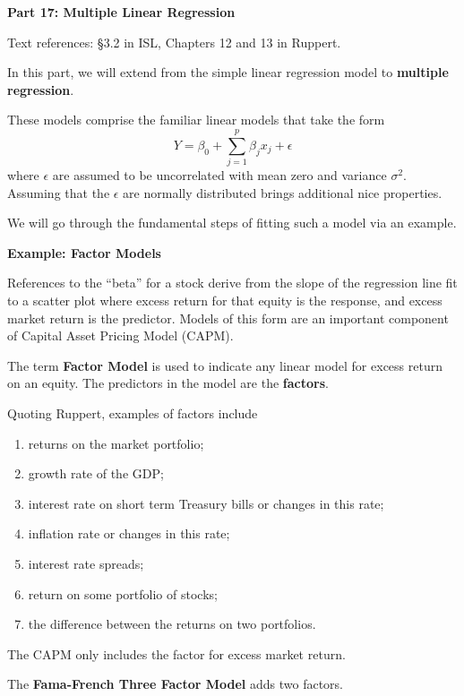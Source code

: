 \documentclass{report}
\begin{document}
\huge
{\bf Part 17: Multiple Linear Regression}

\Large
Text references: \S 3.2 in ISL, Chapters 12 and 13 in Ruppert.

In this part, we will extend from the simple linear regression
model to {\bf multiple regression}.

These models
comprise the familiar linear models that take the form
\[
   Y = \beta_0 + \sum_{j=1}^p \beta_j x_j + \epsilon
\]
where $\epsilon$ are assumed to be uncorrelated 
with mean zero and variance $\sigma^2$. Assuming that
the $\epsilon$ are normally distributed brings additional
nice properties.

We will go through the fundamental steps of fitting such a model
via an example.

\newpage
\makerule

{\bf \LARGE Example: Factor Models}

References to the ``beta'' for a stock derive from the
slope of the regression line fit to a scatter plot where
excess return for that equity is the response, and excess market
return is the predictor.
Models of this form are an important component
of Capital Asset Pricing Model (CAPM).

The term {\bf Factor Model} is used to indicate any
linear model for excess return on an equity. The predictors
in the model are the {\bf factors}. 

Quoting Ruppert, examples of factors include

\vspace{-.4in}
\begin{enumerate}
\item returns on the market portfolio;
\item growth rate of the GDP;
\item interest rate on short term Treasury bills or changes in this rate;
\item inflation rate or changes in this rate;
\item interest rate spreads;
\item return on some portfolio of stocks;
\item the difference between the returns on two portfolios.
\end{enumerate}

\newpage

The CAPM only includes the factor for excess market return.

The {\bf Fama-French Three Factor Model} adds two
factors.
\end{document}
